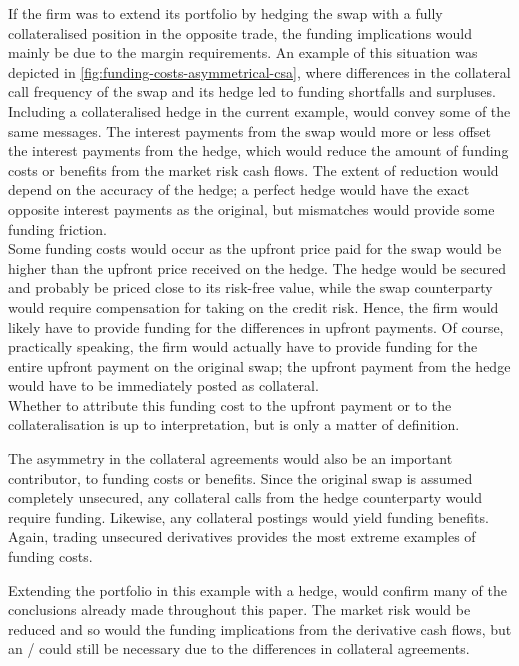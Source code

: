 \documentclass[main.tex]{subfiles}
\begin{document}
        If the firm was to extend its portfolio by hedging the swap
        with a fully collateralised position in the opposite trade,
        the funding implications would mainly be due to the margin requirements.
        An example of this situation was depicted in \cref{fig:funding-costs-asymmetrical-csa},
        where differences in the collateral call frequency of the swap and its hedge
        led to funding shortfalls and surpluses.
        \\
        Including a collateralised hedge in the current example, would convey some of the same messages.
        The interest payments from the swap would more or less 
        offset the interest payments from the hedge, 
        which would reduce the amount of funding costs or benefits from the market risk cash flows.
        The extent of reduction would depend on the accuracy of the hedge;
        a perfect hedge would have the exact opposite interest payments as the original,
        but mismatches would provide some funding friction.
        \\
        Some funding costs would occur as the upfront price paid for the swap 
        would be higher than the upfront price received on the hedge.
        The hedge would be secured and probably be priced close to its risk-free value, 
        while the swap counterparty would require compensation for taking on the credit risk.
        Hence, the firm would likely have to provide funding 
        for the differences in upfront payments.
        Of course, practically speaking, the firm would actually have to provide funding
        for the entire upfront payment on the original swap;
        the upfront payment from the hedge would have to be immediately posted as collateral.
        \\
        Whether to attribute this funding cost to the upfront payment or to the collateralisation
        is up to interpretation, but is only a matter of definition.

        The asymmetry in the collateral agreements would also be an important contributor,
        to funding costs or benefits.
        Since the original swap is assumed completely unsecured, 
        any collateral calls from the hedge counterparty would require funding.
        Likewise, any collateral postings would yield funding benefits.
        Again, trading unsecured derivatives provides the most extreme examples of funding costs.

        Extending the portfolio in this example with a hedge,
        would confirm many of the conclusions already made throughout this paper.
        The market risk would be reduced and so would the funding implications 
        from the derivative cash flows,
        but an \FVA/ could still be necessary due to the differences in collateral agreements.
\end{document}
